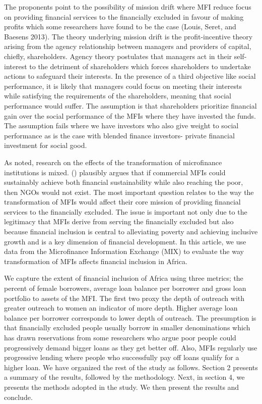 \documentclass[
]{article}
\begin{document}
The proponents point to the possibility of mission drift where MFI
reduce focus on providing financial services to the financially excluded
in favour of making profits which some researchers have found to be the
case (Louis, Seret, and Baesens 2013). The theory underlying mission
drift is the profit-incentive theory arising from the agency
relationship between managers and providers of capital, chiefly,
shareholders. Agency theory postulates that managers act in their
self-interest to the detriment of shareholders which forces shareholders
to undertake actions to safeguard their interests. In the presence of a
third objective like social performance, it is likely that managers
could focus on meeting their interests while satisfying the requirements
of the shareholders, meaning that social performance would suffer. The
assumption is that shareholders prioritize financial gain over the
social performance of the MFIs where they have invested the funds. The
assumption fails where we have investors who also give weight to social
performance as is the case with blended finance investors- private
financial investment for social good.

As noted, research on the effects of the transformation of microfinance
institutions is mixed. () plausibly argues that if commercial MFIs could
sustainably achieve both financial sustainability while also reaching
the poor, then NGOs would not exist. The most important question relates
to the way the transformation of MFIs would affect their core mission of
providing financial services to the financially excluded. The issue is
important not only due to the legitimacy that MFIs derive from serving
the financially excluded but also because financial inclusion is central
to alleviating poverty and achieving inclusive growth and is a key
dimension of financial development. In this article, we use data from
the Microfinance Information Exchange (MIX) to evaluate the way
transformation of MFIs affects financial inclusion in Africa.

We capture the extent of financial inclusion of Africa using three
metrics; the percent of female borrowers, average loan balance per
borrower and gross loan portfolio to assets of the MFI. The first two
proxy the depth of outreach with greater outreach to women an indicator
of more depth. Higher average loan balance per borrower corresponds to
lower depth of outreach. The presumption is that financially excluded
people usually borrow in smaller denominations which has drawn
reservations from some researchers who argue poor people could
progressively demand bigger loans as they get better off. Also, MFIs
regularly use progressive lending where people who successfully pay off
loans qualify for a higher loan. We have organized the rest of the study
as follows. Section 2 presents a summary of the results, followed by the
methodology. Next, in section 4, we presents the methods adopted in the
study. We then present the results and conclude.
\end{document}
